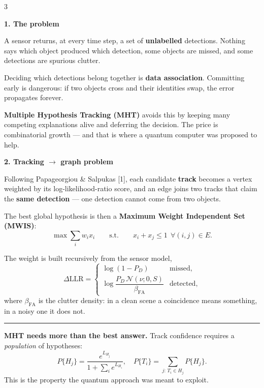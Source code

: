 \documentclass{article}
\newcommand{\sectfont}{\fontsize{28}{34}\selectfont}
\newcommand{\bodyfont}{\fontsize{19}{23}\selectfont}
\newcommand{\headsec}[1]{%
  \par\vspace{3.5mm}%
  \colorbox{nbblue}{\begin{minipage}{\dimexpr\linewidth-2\fboxsep\relax}
    \vspace{1mm}\color{white}\sectfont\textbf{#1}\vspace{1mm}
  \end{minipage}}\par\vspace{3mm}}
\newcommand{\keybox}[2]{%
  \par\vspace{2mm}%
  {\color{#1}\rule{\linewidth}{1.2mm}}\par\vspace{-1mm}
  \colorbox{nblight}{\begin{minipage}{\dimexpr\linewidth-2\fboxsep\relax}
    \vspace{1mm}\bodyfont #2\vspace{1mm}
  \end{minipage}}\par\vspace{2mm}}
\begin{document}
\vspace{6mm}

\begin{multicols}{3}

\headsec{1. The problem}

A sensor returns, at every time step, a set of \textbf{unlabelled} detections.
Nothing says which object produced which detection, some objects are missed, and
some detections are spurious clutter.

Deciding which detections belong together is \textbf{data association}. Committing
early is dangerous: if two objects cross and their identities swap, the error
propagates forever.

\textbf{Multiple Hypothesis Tracking (MHT)} avoids this by keeping many competing
explanations alive and deferring the decision. The price is combinatorial growth
--- and that is where a quantum computer was proposed to help.

\headsec{2. Tracking $\rightarrow$ graph problem}

Following Papageorgiou \& Salpukas [1], each candidate \textbf{track} becomes a
vertex weighted by its log-likelihood-ratio score, and an edge joins two tracks
that claim the \textbf{same detection} --- one detection cannot come from two
objects.

The best global hypothesis is then a
\textbf{Maximum Weight Independent Set (MWIS)}:
\[
  \max \sum_i w_i x_i
  \qquad\text{s.t.}\qquad
  x_i + x_j \le 1 \ \ \forall (i,j)\in E .
\]

The weight is built recursively from the sensor model,
\[
  \Delta\mathrm{LLR} =
  \begin{cases}
    \log(1-P_D) & \text{missed},\\[3pt]
    \log\dfrac{P_D\,\mathcal{N}(\nu;0,S)}{\beta_{\mathrm{FA}}} & \text{detected},
  \end{cases}
\]
where $\beta_{\mathrm{FA}}$ is the clutter density: in a clean scene a
coincidence means something, in a noisy one it does not.

\keybox{nbaccent}{\textbf{MHT needs more than the best answer.} Track confidence
requires a \emph{population} of hypotheses:
\[
  P\{H_j\}=\frac{e^{L_{H_j}}}{1+\sum_i e^{L_{H_i}}},
  \quad P\{T_i\}=\!\!\!\sum_{j:\,T_i\in H_j}\!\!\! P\{H_j\}.
\]
This is the property the quantum approach was meant to exploit.}


\end{multicols}
\end{document}
